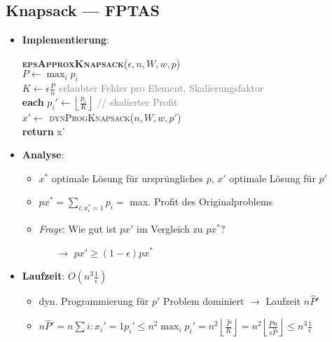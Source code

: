 \subsection{Knapsack --- FPTAS}
\begin{itemize}
  \item \textbf{Implementierung}:
  \begin{pseudocode}
    \textsc{\textbf{epsApproxKnapsack}}($ \epsilon, n, W, w, p $) \\
    $ P \leftarrow \max_ip_i $ \\
    $ K \leftarrow \epsilon\tfrac{P}{n} $ \enskip{} \textcolor{gray}{erlaubter Fehler pro Element, Skalierungsfaktor}\\
    \textbf{each} $ p_i' \leftarrow \left\lfloor \tfrac{p_i}{K} \right\rfloor $ \enskip{} \textcolor{gray}{// skalierter Profit}\\
    $ x' \leftarrow $ \textsc{dynProgKnapsack}($ n, W, w, p' $) \\
    \textbf{return} x'  
  \end{pseudocode}
  \item \textbf{Analyse}:
  \begin{itemize}
    \item $ x^* $ optimale Lösung für ursprüngliches $ p $, $ x' $ optimale Lösung für $ p' $
    \item $ px^* = \sum_{i : x_i^* = 1}p_i = $ max. Profit des Originalproblems
    \item \emph{Frage}: Wie gut ist $ px' $ im Vergleich zu $ px^* $?
    \begin{itemize}
      \item[$ \to $] $ px' \geq (1-\epsilon)px^* $ 
    \end{itemize}
  \end{itemize}
  \item \textbf{Laufzeit}: $ O(n^3\tfrac{1}{\epsilon}) $
  \begin{itemize}
    \item dyn. Programmierung für $ p' $ Problem dominiert $ \to $ Laufzeit $ n\hat{P}' $
    \item $ n\hat{P}' = n\sum{i : x_i' = 1}p_i' \leq n^2\max_ip_i' = n^2\left\lfloor \tfrac{\hat{P}}{K}\right\rfloor = n^2\left\lfloor \tfrac{\hat{P}n}{\epsilon \hat{P}} \right\rfloor \leq n^3\tfrac{1}{\epsilon} $
  \end{itemize}
\end{itemize}